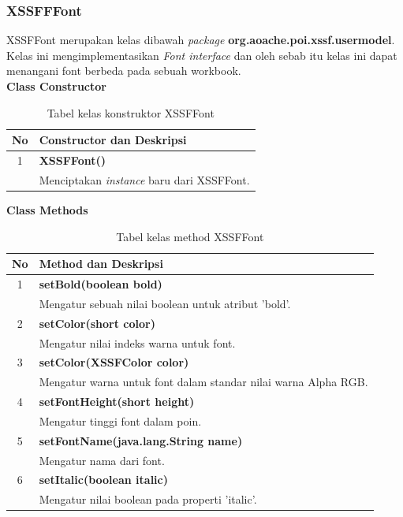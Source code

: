 \subsubsection{XSSFFFont}
\label{subs:XSSFFFont}
XSSFFont merupakan kelas dibawah \textit{package} \textbf{org.aoache.poi.xssf.usermodel}. Kelas ini mengimplementasikan \textit{Font interface} dan oleh sebab itu kelas ini dapat menangani font berbeda pada sebuah workbook.\cite{apachepoi2}
\\
\noindent \textbf{Class Constructor}
\begin{table}[H]
		\centering
		\caption{Tabel kelas konstruktor XSSFFont}
		\label{tab:KonstrukXSSFFont}
	\begin{tabular}{|c|p{12cm}|}
		\hline
		\textbf{No} & \textbf{Constructor dan Deskripsi} \\ \hline \hline
		1 & \textbf{XSSFFont()}\\
			&	Menciptakan \textit{instance} baru dari XSSFFont.\\ \hline
	\end{tabular}
\end{table}

\noindent \textbf{Class Methods}
\begin{table}[H]
		\centering
		\caption{Tabel kelas method XSSFFont}
		\label{tab:methodXSSFFont}
	\begin{tabular}{|c|p{12cm}|}
		\hline
		\textbf{No} & \textbf{Method dan Deskripsi} \\ \hline \hline
		1 & \textbf{setBold(boolean bold)}\\
			&	Mengatur sebuah nilai boolean untuk atribut 'bold'.\\ \hline
		2 & \textbf{setColor(short color)}\\
			&	Mengatur nilai indeks warna untuk font.\\ \hline
		3 & \textbf{setColor(XSSFColor color)}\\
			&	Mengatur warna untuk font dalam standar nilai warna Alpha RGB.\\ \hline
		4 & \textbf{setFontHeight(short height)}\\
			&	Mengatur tinggi font dalam poin.\\ \hline
		5 & \textbf{setFontName(java.lang.String name)}\\
			&	Mengatur nama dari font.\\ \hline
		6 & \textbf{setItalic(boolean italic)}\\
			&	Mengatur nilai boolean pada properti 'italic'.\\ \hline					
	\end{tabular}
\end{table}

